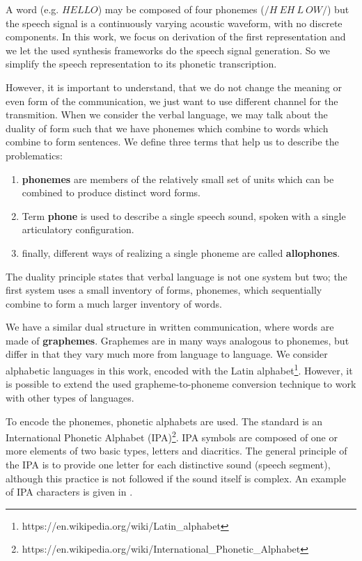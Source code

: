 A word (e.g. $HELLO$) may be composed of four phonemes ($/H\:EH\:L\:OW/$) but the speech signal is a continuously varying acoustic waveform, with no discrete components.
In this work, we focus on derivation of the first representation and we let the used synthesis frameworks do the speech signal generation.
So we simplify the speech representation to its phonetic transcription.
\par
However, it is important to understand, that we do not change the meaning or even form of the communication, we just want to use different channel for the transmition.
When we consider the verbal language, we may talk about the duality of form such that we have phonemes which combine to words which combine to form sentences.
We define three terms that help us to describe the problematics:
\begin{enumerate}
\item \textbf{phonemes} are members of the relatively small set of units which can be combined to produce distinct word forms.
\item Term \textbf{phone} is used to describe a single speech sound, spoken with a single articulatory configuration.
\item finally, different ways of realizing a single phoneme are called \textbf{allophones}.
\end{enumerate}
The duality principle states that verbal language is not one system but two; the first system uses a
small inventory of forms, phonemes, which sequentially combine to form a much larger inventory
of words.
\par
We have a similar dual structure in written communication, where words are made of \textbf{graphemes}.
Graphemes are in many ways analogous to phonemes, but differ in that they vary much more from language to language.
We consider alphabetic languages in this work, encoded with the Latin alphabet\footnote{https://en.wikipedia.org/wiki/Latin\_alphabet}.
However, it is possible to extend the used grapheme-to-phoneme conversion technique \cite{bisani2008joint} to work with other types of languages.
\par
To encode the phonemes, phonetic alphabets are used.
The standard is an International Phonetic Alphabet (IPA)\footnote{https://en.wikipedia.org/wiki/International\_Phonetic\_Alphabet}.
IPA symbols are composed of one or more elements of two basic types, letters and diacritics.
The general principle of the IPA is to provide one letter for each distinctive sound (speech segment), although this practice is not followed if the sound itself is complex.
An example of IPA characters is given in .
\pagebreak
